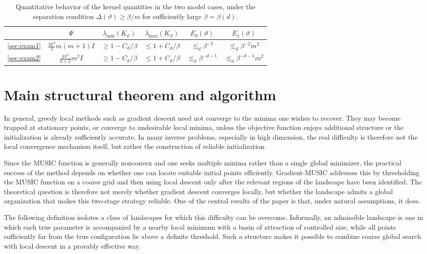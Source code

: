 \documentclass[11pt]{article}
\theoremstyle{definition}
\numberwithin{theorem}{section}
\numberwithin{lemma}{section}
\numberwithin{equation}{section}
\numberwithin{equation}{section}
\begin{document}
\begin{table}[ht]
\centering
\begin{tabular}{|c|c|c|c|c|c|}
\hline
 & $\Psi$ & $\lambda_{\min}(K_\vartheta)$ & $\lambda_{\max}(K_\vartheta)$ & $E_0(\vartheta)$ & $E_1(\vartheta)$ \\
\hline
\cref{sec:exam1}
& $\frac{4\pi^2}{3}m(m+1)I$
& $\ge 1-C_d/\beta$
& $\le 1+C_d/\beta$
& $\lesssim_d \beta^{-2}$
& $\lesssim_d \beta^{-2}m^2$
\\
\hline
\cref{sec:exam2}
& $\frac{4\pi^2}{d+2}m^2 I$
& $\ge 1-C_d/\beta$
& $\le 1+C_d/\beta$
& $\lesssim_d \beta^{-d-1}$
& $\lesssim_d \beta^{-d-1}m^2$
\\
\hline
\end{tabular}
\caption{Quantitative behavior of the kernel quantities in the two model cases, under the separation condition $\Delta(\vartheta)\ge \beta/m$ for sufficiently large $\beta=\beta(d)$.}
\label{table:kernel2}
\end{table}


  	\section{Main structural theorem and algorithm}
\label{sec:structural}

In general, greedy local methods such as gradient descent need not converge to the minima one wishes to recover. They may become trapped at stationary points, or converge to undesirable local minima, unless the objective function enjoys additional structure or the initialization is already sufficiently accurate. In many inverse problems, especially in high dimension, the real difficulty is therefore not the local convergence mechanism itself, but rather the construction of reliable initialization.

{Since the MUSIC function is generally nonconvex and one seeks multiple minima rather than a single global minimizer, the practical success of the method depends on whether one can locate suitable initial points efficiently. Gradient-MUSIC addresses this by thresholding the MUSIC function on a coarse grid and then using local descent only after the relevant regions of the landscape have been identified. The theoretical question is therefore not merely whether gradient descent converges locally, but whether the landscape admits a global organization that makes this two-stage strategy reliable. One of the central results of the paper is that, under natural assumptions, it does.
}

The following definition isolates a class of landscapes for which this difficulty can be overcome. Informally, an admissible landscape is one in which each true parameter is accompanied by a nearby local minimum with a basin of attraction of controlled size, while all points sufficiently far from the true configuration lie above a definite threshold. Such a structure makes it possible to combine coarse global search with local descent in a provably effective way.
\end{document}
